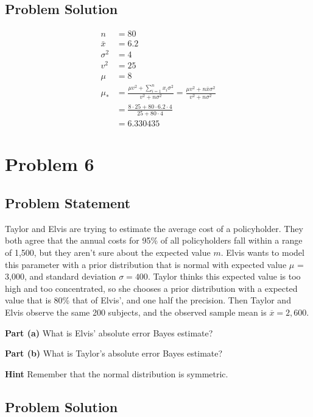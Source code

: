 \documentclass[12pt]{article}
\theoremstyle{definition}
\begin{document}
\subsection*{Problem Solution}
\begin{align*}
n &= 80\\
\bar{x} &= 6.2\\
\sigma^2 &= 4\\
v^2 &= 25\\
\mu &= 8\\
\mu_{*} &= \frac{\mu v^2 + \sum_{i=1}^n x_i \sigma^2}{v^2 + n\sigma^2} = \frac{\mu v^2 + n \bar{x}\sigma^2}{v^2 + n\sigma^2}\\
&= \frac{8 \cdot 25 + 80 \cdot 6.2 \cdot 4}{25 + 80 \cdot 4}\\
&= 6.330435
\end{align*}



\newpage
\section*{Problem 6}

\subsection*{Problem Statement}

Taylor and Elvis are trying to estimate the average cost of a policyholder. They both agree that the annual costs for 95\% of all policyholders fall within a range of 1,500, but they aren't sure about the expected value $m$. Elvis wants to model this parameter with a prior distribution that is normal with expected value $\mu$ = 3,000, and standard deviation $\sigma = 400$. Taylor thinks this expected value is too high and too concentrated, so she chooses a prior distribution with a expected value that is 80\% that of Elvis', and one half the precision. Then Taylor and Elvis observe the same 200 subjects, and the observed sample mean is $\overline{x} = 2,600$.

\bigskip
\noindent
{\bf Part (a)} What is Elvis' absolute error Bayes estimate?

\bigskip
\noindent
{\bf Part (b)} What is Taylor's absolute error Bayes estimate?

\bigskip
\noindent
{\bf Hint} Remember that the normal distribution is symmetric.

\subsection*{Problem Solution}
\end{document}
